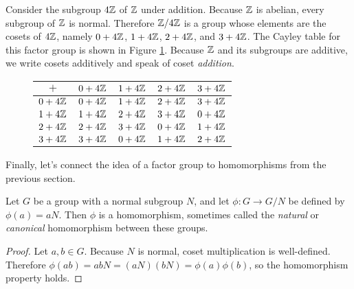 \begin{example}
Consider the subgroup $4\mathbb{Z}$ of $\mathbb{Z}$ under addition. Because $\mathbb{Z}$ is abelian, every subgroup of $\mathbb{Z}$ is normal. Therefore $\mathbb{Z}/4\mathbb{Z}$ is a group whose elements are the cosets of $4\mathbb{Z}$, namely $0+4\mathbb{Z}$, $1+4\mathbb{Z}$, $2+4\mathbb{Z}$, and $3+4\mathbb{Z}$. The Cayley table for this factor group is shown in Figure \ref{z4z_cayley}. Because $\mathbb{Z}$ and its subgroups are additive, we write cosets additively and speak of coset \textit{addition}.

\begin{figure}[ht]
\centering
\begin{tabular}{c | c c c c}
    $+$     & $0+4\mathbb{Z}$ & $1+4\mathbb{Z}$ & $2+4\mathbb{Z}$ & $3+4\mathbb{Z}$ \\
    \hline
    $0+4\mathbb{Z}$ & $0+4\mathbb{Z}$ & $1+4\mathbb{Z}$ & $2+4\mathbb{Z}$ & $3+4\mathbb{Z}$ \\
    $1+4\mathbb{Z}$ & $1+4\mathbb{Z}$ & $2+4\mathbb{Z}$ & $3+4\mathbb{Z}$ & $0+4\mathbb{Z}$ \\
    $2+4\mathbb{Z}$ & $2+4\mathbb{Z}$ & $3+4\mathbb{Z}$ & $0+4\mathbb{Z}$ & $1+4\mathbb{Z}$ \\
    $3+4\mathbb{Z}$ & $3+4\mathbb{Z}$ & $0+4\mathbb{Z}$ & $1+4\mathbb{Z}$ & $2+4\mathbb{Z}$
\end{tabular}
\caption{}
\label{z4z_cayley}
\end{figure}
\end{example}

Finally, let's connect the idea of a factor group to homomorphisms from the previous section.

\begin{theorem}
Let $G$ be a group with a normal subgroup $N$, and let $\phi: G \to G/N$ be defined by $\phi(a) = aN$. Then $\phi$ is a homomorphism, sometimes called the \textit{natural} or \textit{canonical} homomorphism between these groups.
\end{theorem}

\begin{proof}
Let $a, b \in G$. Because $N$ is normal, coset multiplication is well-defined. Therefore $\phi(ab) = abN = (aN)(bN) = \phi(a)\phi(b)$, so the homomorphism property holds.

\end{proof}